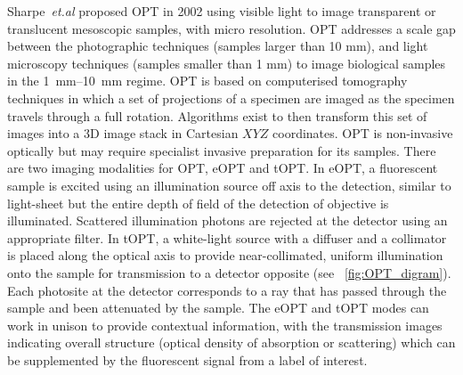 Sharpe~\emph{et.al} proposed \gls{OPT} in 2002 \cite{sharpe_optical_2002}
using visible light to image transparent or translucent mesoscopic samples, with micro resolution.
\gls{OPT} addresses a scale gap between the photographic techniques (samples larger than 10 mm), and light microscopy techniques (samples smaller than 1 mm) to image biological samples in the \SIrange{1}{10}{\milli\meter} regime.
\gls{OPT} is based on computerised tomography techniques \cite{[17]} in which a set of projections of a specimen are imaged as the specimen travels through a full rotation.
Algorithms exist to then transform this set of images into a
\gls{3D} image stack in Cartesian \(XYZ\) coordinates.
\gls{OPT} is non-invasive optically but may require specialist invasive preparation for its samples.
There are two imaging modalities for \gls{OPT}, \gls{eOPT} and \gls{tOPT}.
In \gls{eOPT}, a fluorescent sample is excited using an illumination source off axis to the detection, similar to \gls{light-sheet} but the entire \gls{depth of field} of the detection of objective is illuminated.
Scattered illumination photons are rejected at the detector using an appropriate filter.
In tOPT, a white-light source with a diffuser and a collimator is placed along the optical axis to provide near-collimated, uniform illumination onto the sample for transmission to a detector opposite (see \figurename~\ref{fig:OPT_digram}).
Each \gls{photosite} at the detector corresponds to a ray that has passed through the sample and been attenuated by the sample.
The \gls{eOPT} and \gls{tOPT} modes can work in unison to provide contextual information, with the transmission images indicating overall structure (optical density of absorption or scattering) which can be supplemented by the fluorescent signal from a label of interest.
%

